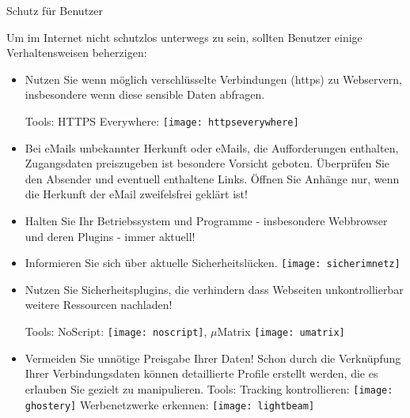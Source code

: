 \documentclass[final]{beamer}
\newlength{\sepwid}
\newlength{\twocolwid}
\begin{document}
\begin{frame}[t]
\begin{columns}[t, totalwidth=\textwidth]
\begin{column}{\twocolwid}
\end{column} %

\begin{column}{\sepwid}\end{column} %

\end{columns} %
\begin{columns}

\begin{column}{0.95\textwidth}

\begin{alertblock}{Schutz für Benutzer}
\small{
Um im Internet nicht schutzlos unterwegs zu sein, sollten Benutzer einige Verhaltensweisen
beherzigen:

\begin{itemize}
 \item Nutzen Sie wenn möglich verschlüsselte Verbindungen (https) zu Webservern, insbesondere
 wenn diese sensible Daten abfragen.\par
 Tools: 
 HTTPS Everywhere: \texttt{[image: httpseverywhere]}

 \item Bei eMails unbekannter Herkunft oder eMails, die Aufforderungen enthalten, Zugangsdaten
 preiszugeben ist besondere Vorsicht geboten. Überprüfen Sie den Absender und eventuell enthaltene
 Links. Öffnen Sie Anhänge nur, wenn die Herkunft der eMail zweifelsfrei geklärt ist!
 
 \item Halten Sie Ihr Betriebssystem und Programme - insbesondere Webbrowser und deren Plugins - 
 immer aktuell!
 
 \item Informieren Sie sich über aktuelle Sicherheitslücken. 
 \texttt{[image: sicherimnetz]}
 
 \item Nutzen Sie Sicherheitsplugins, die verhindern dass Webseiten unkontrollierbar weitere
 Ressourcen nachladen! \par
 Tools: 
 NoScript: \texttt{[image: noscript]}, 
 $\mu{}$Matrix \texttt{[image: umatrix]}

 \item Vermeiden Sie unnötige Preisgabe Ihrer Daten! Schon durch die Verknüpfung Ihrer 
 Verbindungsdaten können detaillierte Profile erstellt werden, die es erlauben Sie gezielt zu 
 manipulieren.
 Tools:
 Tracking kontrollieren: \texttt{[image: ghostery]}
 Werbenetzwerke erkennen: \texttt{[image: lightbeam]}
 

\end{itemize}}
\end{alertblock}
\end{column}
\end{columns}
\end{frame}
\end{document}

